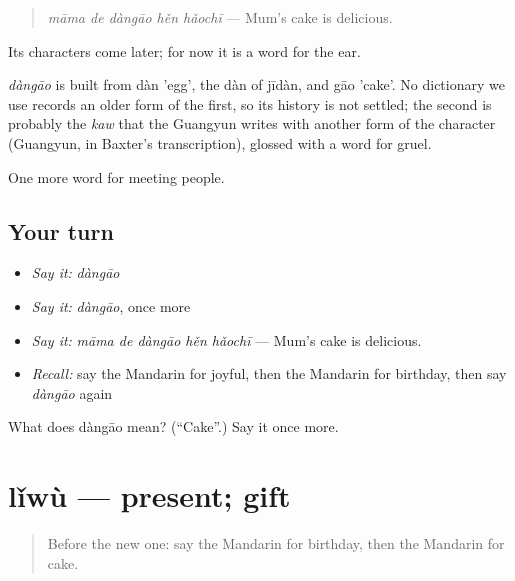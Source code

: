 \begin{quote}
\emph{māma de dàngāo hěn hǎochī} — Mum's cake is delicious.
\end{quote}

Its characters come later; for now it is a word for the ear.

\begin{cousinweb}
\emph{dàngāo} is built from dàn 'egg', the dàn of jīdàn, and gāo 'cake'. No dictionary we use records an older form of the first, so its history is not settled; the second is probably the \emph{kaw} that the Guangyun writes with another form of the character (Guangyun, in Baxter's transcription), glossed with a word for gruel.
\end{cousinweb}

\begin{grammarlens}[title={What you've built}]
One more word for meeting people.
\end{grammarlens}

\subsection*{Your turn}
\begin{itemize}
\raggedright
  \item \emph{Say it:} \emph{dàngāo}
  \item \emph{Say it:} \emph{dàngāo}, once more
  \item \emph{Say it:} \emph{māma de dàngāo hěn hǎochī} — Mum's cake is delicious.
  \item \emph{Recall:} say the Mandarin for joyful, then the Mandarin for birthday, then say \emph{dàngāo} again
\end{itemize}

\begin{tcolorbox}[breakable,colback=teal!4,colframe=teal!35!black,title={Before you move on}]
What does dàngāo mean? (\textquotedblleft{}Cake\textquotedblright{}.) Say it once more.
\end{tcolorbox}
\section[lǐwù]{lǐwù — present; gift}

\label{lesson:ZH-C75-liwu}



\begin{quote}
Before the new one: say the Mandarin for birthday, then the Mandarin for cake.
\end{quote}

